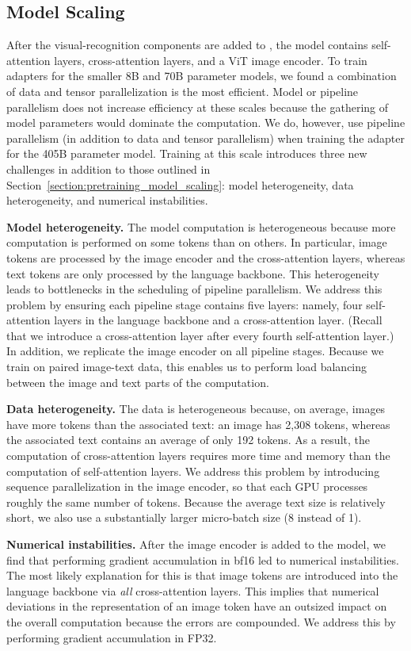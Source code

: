 \subsection{Model Scaling}
\label{section:vision_model_scaling}

After the visual-recognition components are added to \llamathree, the model contains self-attention layers, cross-attention layers, and a ViT image encoder.
To train adapters for the smaller 8B and 70B parameter models, we found a combination of data and tensor parallelization is the most efficient.
Model or pipeline parallelism does not increase efficiency at these scales because the gathering of model parameters would dominate the computation.
We do, however, use pipeline parallelism (in addition to data and tensor parallelism) when training the adapter for the 405B parameter model.
Training at this scale introduces three new challenges in addition to those outlined in Section~\ref{section:pretraining_model_scaling}: model heterogeneity, data heterogeneity, and numerical instabilities.

\textbf{Model heterogeneity.} The model computation is heterogeneous because more computation is performed on some tokens than on others.
In particular, image tokens are processed by the image encoder and the cross-attention layers, whereas text tokens are only processed by the language backbone.
This heterogeneity leads to bottlenecks in the scheduling of pipeline parallelism.
We address this problem by ensuring each pipeline stage contains five layers: namely, four self-attention layers in the language backbone and a cross-attention layer.
(Recall that we introduce a cross-attention layer after every fourth self-attention layer.)
In addition, we replicate the image encoder on all pipeline stages.
Because we train on paired image-text data, this enables us to perform load balancing between the image and text parts of the computation.

\textbf{Data heterogeneity.} The data is heterogeneous because, on average, images have more tokens than the associated text: an image has 2,308 tokens, whereas the associated text contains an average of only 192 tokens.
As a result, the computation of cross-attention layers requires more time and memory than the computation of self-attention layers.
We address this problem by introducing sequence parallelization in the image encoder, so that each GPU processes roughly the same number of tokens.
Because the average text size is relatively short, we also use a substantially larger micro-batch size (8 instead of 1).

\textbf{Numerical instabilities.} After the image encoder is added to the model, we find that performing gradient accumulation in bf16 led to numerical instabilities.
The most likely explanation for this is that image tokens are introduced into the language backbone via \emph{all} cross-attention layers.
This implies that numerical deviations in the representation of an image token have an outsized impact on the overall computation because the errors are compounded.
We address this by performing gradient accumulation in FP32.
